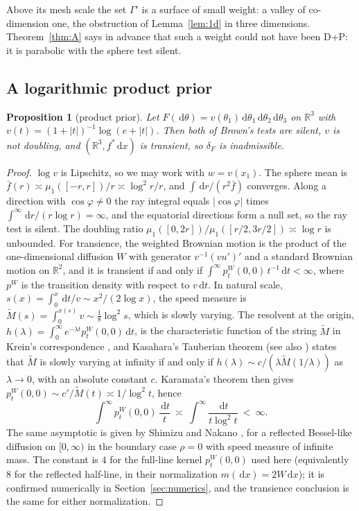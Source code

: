 \documentclass[11pt]{amsart}
\newcommand{\R}{\mathbb{R}}
\newcommand{\dd}{\,\mathrm{d}}
\newcommand{\abs}[1]{\lvert #1\rvert}
\newcommand{\fbar}{\bar f}
\theoremstyle{plain}
\newtheorem{proposition}[theorem]{Proposition}
\theoremstyle{definition}
\theoremstyle{remark}
\begin{document}
Above its mesh scale the set $\Gamma'$ is a surface of small weight: a valley of
co-dimension one, the obstruction of Lemma~\ref{lem:1d} in three dimensions.
Theorem~\ref{thm:A} says in advance that such a weight could not have been D+P:
it is parabolic with the sphere test silent.

\subsection{A logarithmic product prior}
\begin{proposition}[product prior]\label{prop:log}
Let $F(\dd\theta)=v(\theta_1)\dd\theta_1\dd\theta_2\dd\theta_3$ on $\R^3$ with
$v(t)=(1+\abs t)^{-1}\log(e+\abs t)$. Then both of Brown's tests are silent,
$v$ is not doubling, and $(\R^3,f^*\dd x)$ is transient, so $\delta_F$ is
inadmissible.
\end{proposition}

\begin{proof}
$\log v$ is Lipschitz, so we may work with $w=v(x_1)$. The sphere mean is
$\fbar(r)\asymp\mu_1([-r,r])/r\asymp\log^2r/r$, and $\int\dd r/(r^2\fbar)$
converges. Along a direction with $\cos\varphi\ne0$ the ray integral equals
$\abs{\cos\varphi}$ times $\int^\infty\dd r/(r\log r)=\infty$, and the
equatorial directions form a null set, so the ray test is silent. The doubling ratio
$\mu_1([0,2r])/\mu_1([r/2,3r/2])\asymp\log r$ is unbounded. For transience, the
weighted Brownian motion is the product of the one-dimensional diffusion $W$
with generator $v^{-1}(vu')'$ and a standard Brownian motion on $\R^2$, and it
is transient if and only if $\int^\infty p^W_t(0,0)\,t^{-1}\dd t<\infty$,
where $p^W$ is the transition density with respect to $v\dd t$. In natural
scale, $s(x)=\int_0^x\dd t/v\sim x^2/(2\log x)$, the speed measure is
$\widetilde M(s)=\int_0^{x(s)}v\sim\frac18\log^2s$, which is slowly varying.
The resolvent at the origin, $h(\lambda)=\int_0^\infty e^{-\lambda t}p^W_t(0,0)\dd t$,
is the characteristic function of the string $\widetilde M$ in Krein's
correspondence \cite[eqs.~(5), (10)]{kasahara1975}, and Kasahara's Tauberian
theorem \cite[Thm.~2(iii), case $\alpha=1$]{kasahara1975} (see also
\cite{kotaniwatanabe1982,kasaharawatanabe2010}) states that $\widetilde M$ is slowly varying at
infinity if and only if $h(\lambda)\sim c/(\lambda\widetilde M(1/\lambda))$ as
$\lambda\to0$, with an absolute constant $c$. Karamata's theorem then gives
$p^W_t(0,0)\sim c'/\widetilde M(t)\asymp1/\log^2t$, hence
\[
\int^\infty p^W_t(0,0)\,\frac{\dd t}{t}\ \asymp\ \int^\infty\frac{\dd t}{t\log^2t}\ <\ \infty .
\]
The same asymptotic is given by Shimizu and Nakano
\cite[Thm.~1.3]{shimizunakano2017}, for a reflected Bessel-like diffusion on
$[0,\infty)$ in the boundary case $\rho=0$ with speed measure of infinite mass.
The constant is $4$ for the full-line kernel $p^W_t(0,0)$ used here (equivalently
$8$ for the reflected half-line, in their normalization $m(\dd x)=2W\dd x$); it
is confirmed numerically in Section~\ref{sec:numerics}, and the transience
conclusion is the same for either normalization.
\end{proof}
\end{document}
